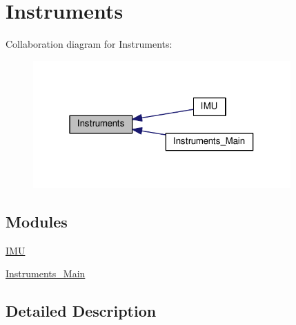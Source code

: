 \hypertarget{group__Instruments}{\section{Instruments}
\label{group__Instruments}
}
Collaboration diagram for Instruments\+:\nopagebreak
\begin{figure}[H]
\begin{center}
\leavevmode
\includegraphics[width=280pt]{group__Instruments}
\end{center}
\end{figure}
\subsection*{Modules}
\begin{DoxyCompactItemize}
\item 
\hyperlink{group__IMU}{I\+M\+U}
\item 
\hyperlink{group__Instruments__Main}{Instruments\+\_\+\+Main}
\end{DoxyCompactItemize}


\subsection{Detailed Description}
